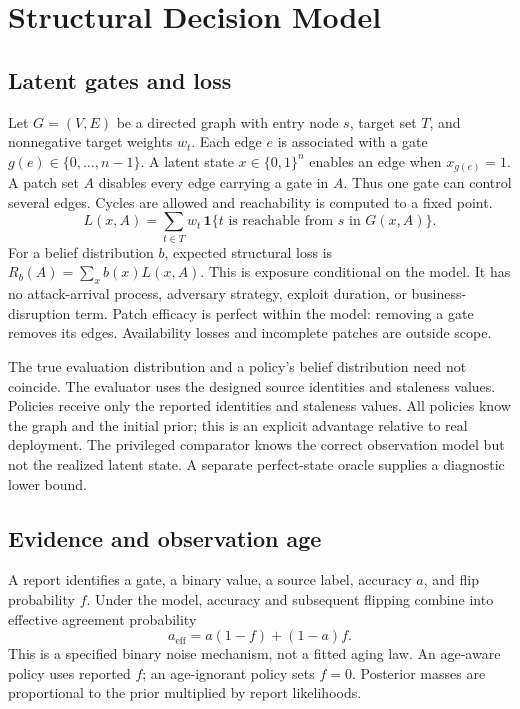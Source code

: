 \documentclass[manuscript,screen,nonacm]{acmart}
\begin{document}
\section{Structural Decision Model}
\subsection{Latent gates and loss}
Let $G=(V,E)$ be a directed graph with entry node $s$, target set $T$, and nonnegative target weights $w_t$. Each edge $e$ is associated with a gate $g(e)\in\{0,\ldots,n-1\}$. A latent state $x\in\{0,1\}^n$ enables an edge when $x_{g(e)}=1$. A patch set $A$ disables every edge carrying a gate in $A$. Thus one gate can control several edges. Cycles are allowed and reachability is computed to a fixed point.
\begin{equation}
 L(x,A)=\sum_{t\in T}w_t\,\mathbf{1}\{t\text{ is reachable from }s\text{ in }G(x,A)\}.
\end{equation}
For a belief distribution $b$, expected structural loss is $R_b(A)=\sum_x b(x)L(x,A)$. This is exposure conditional on the model. It has no attack-arrival process, adversary strategy, exploit duration, or business-disruption term. Patch efficacy is perfect within the model: removing a gate removes its edges. Availability losses and incomplete patches are outside scope.

The true evaluation distribution and a policy's belief distribution need not coincide. The evaluator uses the designed source identities and staleness values. Policies receive only the reported identities and staleness values. All policies know the graph and the initial prior; this is an explicit advantage relative to real deployment. The privileged comparator knows the correct observation model but not the realized latent state. A separate perfect-state oracle supplies a diagnostic lower bound.

\subsection{Evidence and observation age}
A report identifies a gate, a binary value, a source label, accuracy $a$, and flip probability $f$. Under the model, accuracy and subsequent flipping combine into effective agreement probability
\begin{equation}
 a_{\mathrm{eff}}=a(1-f)+(1-a)f.
\end{equation}
This is a specified binary noise mechanism, not a fitted aging law. An age-aware policy uses reported $f$; an age-ignorant policy sets $f=0$. Posterior masses are proportional to the prior multiplied by report likelihoods.
\end{document}
